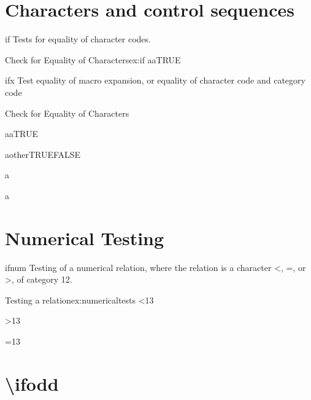 \section{Characters and control sequences}

\begin{docCommand}{if}{}{}
Tests for equality of character codes.
\end{docCommand}

\begin{texexample}{Check for Equality of Characters}{ex:if}
\def\a{a}\def\b{a}
\def\TRUE{TRUE} 
\def\FALSE{FALSE}
\if\a\b\TRUE\fi
\end{texexample}


\begin{docCommand}{ifx}{}{}
Test equality of macro expansion, or equality of character code and category code
\end{docCommand}

\begin{texexample}{Check for Equality of Characters}{}
\def\a{a}\def\b{a}\def\c{other}
\def\TRUE{TRUE}
\def\FALSE{FALSE}

\ifx\a\b\TRUE\fi

\ifx\a\c\TRUE\else\FALSE\fi

\meaning\a

\meaning\b
\end{texexample}


\section{Numerical Testing}

\begin{docCommand}{ifnum}{}
Testing of a numerical relation, where the relation is a character <, =, or >, of category 12.
\end{docCommand}

\begin{texexample}{Testing a relation}{ex:numericaltests}
\edef\a{12}\edef\b{13}
\ifnum\a<\b\TRUE\else\FALSE\fi

\ifnum\a>\b\TRUE\else\FALSE\fi

\ifnum\a=\b\TRUE\else\FALSE\fi
\end{texexample}


\section{\textbackslash ifodd}


